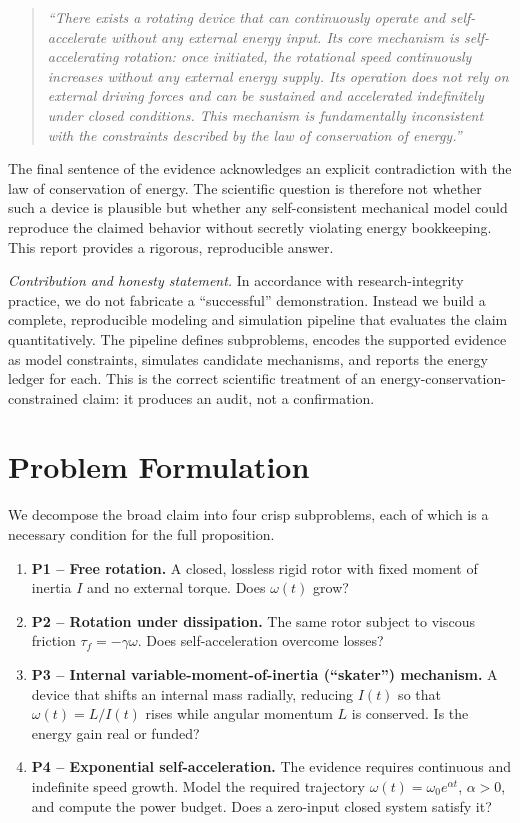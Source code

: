\documentclass[11pt,twoside]{article}
\begin{document}
\begin{quote}
\emph{``There exists a rotating device that can continuously operate and
self-accelerate without any external energy input. Its core mechanism is
self-accelerating rotation: once initiated, the rotational speed continuously
increases without any external energy supply. Its operation does not rely on
external driving forces and can be sustained and accelerated indefinitely under
closed conditions. This mechanism is fundamentally inconsistent with the
constraints described by the law of conservation of energy.''}
\end{quote}

The final sentence of the evidence acknowledges an explicit contradiction with
the law of conservation of energy. The scientific question is therefore not
whether such a device is plausible but whether any self-consistent mechanical
model could reproduce the claimed behavior without secretly violating energy
bookkeeping. This report provides a rigorous, reproducible answer.

\emph{Contribution and honesty statement.} In accordance with research-integrity
practice, we do not fabricate a ``successful'' demonstration. Instead we build a
complete, reproducible modeling and simulation pipeline that evaluates the
claim quantitatively. The pipeline defines subproblems, encodes the supported
evidence as model constraints, simulates candidate mechanisms, and reports the
energy ledger for each. This is the correct scientific treatment of an
energy-conservation-constrained claim: it produces an audit, not a
confirmation.

\section{Problem Formulation}
\label{sec:problems}
We decompose the broad claim into four crisp subproblems, each of which is a
necessary condition for the full proposition.

\newcommand{\om}{\omega}
\begin{enumerate}
\item \textbf{P1 -- Free rotation.} A closed, lossless rigid rotor with fixed
moment of inertia $I$ and no external torque. Does $\om(t)$ grow?
\item \textbf{P2 -- Rotation under dissipation.} The same rotor subject to
viscous friction $\tau_f=-\gamma\om$. Does self-acceleration overcome losses?
\item \textbf{P3 -- Internal variable-moment-of-inertia (``skater'')
mechanism.} A device that shifts an internal mass radially, reducing $I(t)$ so
that $\om(t)=L/I(t)$ rises while angular momentum $L$ is conserved. Is the
energy gain real or funded?
\item \textbf{P4 -- Exponential self-acceleration.} The evidence requires
continuous and indefinite speed growth. Model the required trajectory
$\om(t)=\om_0 e^{\alpha t}$, $\alpha>0$, and compute the power budget. Does a
zero-input closed system satisfy it?
\end{enumerate}
\end{document}
